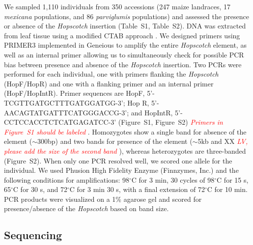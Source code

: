 \documentclass[11pt]{article}
\newcommand{\mbh}[1]{\textcolor{red}{ \emph{\scriptsize  #1}} }
\begin{document}
\begin{linenumbers}
\begin{flushleft}
We sampled 1,110 individuals from 350 accessions (247 maize landraces, 17 \emph{mexicana} populations, and 86 \emph{parviglumis} populations) and assessed the presence or absence of the \emph{Hopscotch} insertion (Table~S1, Table~S2). DNA was extracted from leaf tissue using a modified CTAB approach \citep{DoyleDoyle1990, Maloof1984}. We designed primers using PRIMER3 \citep{RozenSkaletsky2000} implemented in Geneious \citep{Kearse2012} to amplify the entire \emph{Hopscotch} element, as well as an internal primer allowing us to simultaneously check for possible PCR bias between presence and absence of the \emph{Hopscotch} insertion. Two PCRs were performed for each individual, one with primers flanking the \emph{Hopscotch} (HopF/HopR) and one with a flanking primer and an internal primer (HopF/HopIntR). Primer sequences are HopF, {\small 5'-TCGTTGATGCTTTGATGGATGG-3'}; 
Hop R, {\small 5'-AACAGTATGATTTCATGGGACCG-3'}; and HopIntR, {\small  5'-CCTCCACCTCTCATGAGATCC-3'} (Figure~S1, Figure~S2) \mbh{Primers in Figure~S1 should be labeled}. Homozygotes show a single band for absence of the element ($\sim$300bp) and two bands for presence of the element ($\sim$5kb and XX \mbh{LV, please add the size of the second band}), whereas heterozygotes are three-banded (Figure~S2). When only one PCR resolved well, we scored one allele for the individual. We used Phusion High Fidelity Enzyme (Finnzymes, Inc.) and the following conditions for amplifications: 98$^{\circ}$C for 3 min, 30 cycles of 98$^{\circ}$C for 15 s, 65$^{\circ}$C for 30 s, and 72$^{\circ}$C for 3 min 30 s, with a final extension of 72$^{\circ}$C for 10 min. PCR products were visualized on a 1\% agarose gel and scored for presence/absence of the \emph{Hopscotch} based on band size.

\subsection*{Sequencing}


\end{flushleft}
\end{linenumbers}
\end{document}
